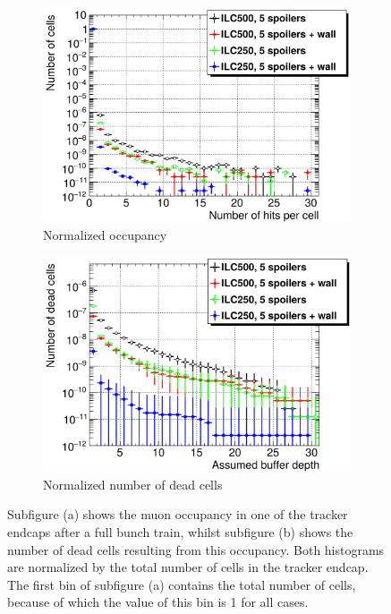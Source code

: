   \begin{figure}
 \centering
  \begin{subfigure}[b]{0.49\textwidth}
   \centering
    \includegraphics[width=\textwidth]{Figures/BDS_muons/Occupancy_Comparison_All_layers_wrt_cells_SiTrackerEndcap.png}
   \caption{Normalized occupancy}
   \end{subfigure}
   \hfill
    \begin{subfigure}[b]{0.49\textwidth}
   \centering
    \includegraphics[width=\textwidth]{Figures/BDS_muons/Occupancy_Comparison_All_layers_deadcells_SiTrackerEndcap.png}
   \caption{Normalized number of dead cells}
   \end{subfigure}
   \caption[\sid tracker endcap occupancy from BDS muons]{Subfigure (a) shows the muon occupancy in one of the \sid tracker endcaps after a full bunch train, whilst subfigure (b) shows the number of dead cells resulting from this occupancy.
   Both histograms are normalized by the total number of cells in the tracker endcap.
   The first bin of subfigure (a) contains the total number of cells, because of which the value of this bin is 1 for all cases.}
   \label{fig:BDS_Muons:SiTrackerEndcap}
 \end{figure}
 
